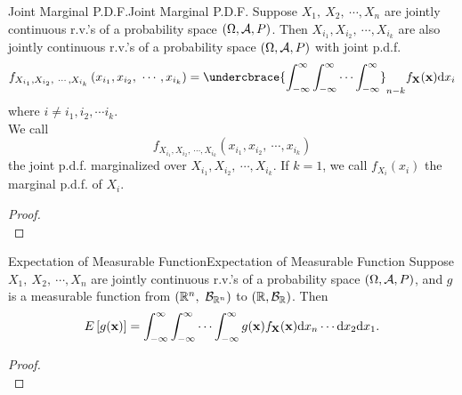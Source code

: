 \documentclass{elegantbook}
\begin{document}
\begin{theorem}{Joint Marginal P.D.F.}{Joint Marginal P.D.F.}
Suppose $X_1,\ X_2,\ \cdots,X_n$ are jointly continuous r.v.'s of a probability space $(\Omega,\mathcal{A}, P)$. Then $X_{i_1},X_{i_2},\ \cdots,X_{i_k}$ are also jointly continuous r.v.'s of a probability space $(\Omega,\mathcal{A}, P)$ with joint p.d.f.
$$
f_{X_{i_1},X_{i_2},\ \cdots,X_{i_k}}\left(x_{i_1},x_{i_2},\ \cdots,x_{i_k}\right)=\undercbrace{\int_{-\infty}^{\infty}\int_{-\infty}^{\infty}\cdots\int_{-\infty}^{\infty}}_{n-k}{f_{\mX}(\mx)\dif x_i}
$$
where $i\neq i_1,i_2,\cdots i_k$.\\
We call $$f_{X_{i_1},X_{i_2},\ \cdots,X_{i_k}}\left(x_{i_1},x_{i_2},\ \cdots,x_{i_k}\right)$$ the joint p.d.f. marginalized over $X_{i_1},X_{i_2},\ \cdots,X_{i_k}$. If $k=1$, we call $f_{X_i}(x_i)$ the marginal p.d.f. of $X_i$.
\end{theorem}

\begin{proof}
\\[4cm]\vspace{0.01cm}
\end{proof}

\begin{theorem}{Expectation of Measurable Function}{Expectation of Measurable Function}
Suppose $X_1,\ X_2,\ \cdots,X_n$ are jointly continuous r.v.'s of a probability space $(\Omega,\mathcal{A}, P)$, and $g$ is a measurable function from $(\mathbb{R}^n,\ \mb_{\mathbb{R}^n})$ to $(\mathbb{R},\mathcal{B}_\mathbb{R})$. Then
$$
E\left[g(\mx)\right]=\int_{-\infty}^{\infty}\int_{-\infty}^{\infty}{\cdots\int_{-\infty}^{\infty}{g(\mx)f_{\mX}(\mx)\dif x_n\cdots \dif x_2\dif x_1}}.
$$
\end{theorem}

\begin{proof}
\\[4cm]\vspace{0.01cm}
\end{proof}
\end{document}
